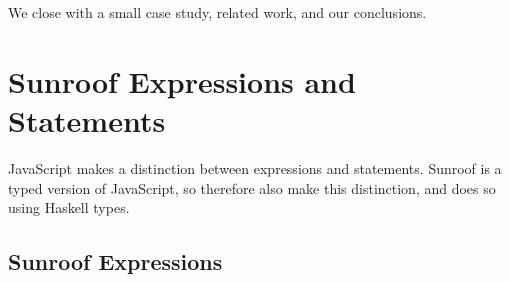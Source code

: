 \documentclass{llncs}
\begin{document}
\noindent
We close with a small case study, related work, and our conclusions.



\section{Sunroof Expressions and Statements} %
\label{sec:object-model}

JavaScript makes a distinction between expressions and statements.
Sunroof is a typed version of JavaScript, so therefore also
make this distinction, and does so using Haskell types.

\subsection{Sunroof Expressions}
\end{document}
